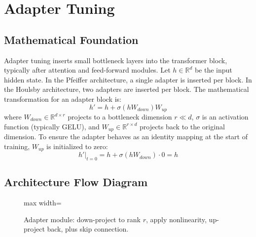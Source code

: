 \documentclass{article}
\begin{document}
\newpage
\section{Adapter Tuning}

\subsection{Mathematical Foundation}
Adapter tuning inserts small bottleneck layers into the transformer block, typically after attention and feed-forward modules. Let $h \in \mathbb{R}^d$ be the input hidden state.
In the Pfeiffer architecture, a single adapter is inserted per block. In the Houlsby architecture, two adapters are inserted per block. The mathematical transformation for an adapter block is:
\begin{equation}
  h' = h + \sigma(h W_{down}) W_{up}
\end{equation}
where $W_{down} \in \mathbb{R}^{d \times r}$ projects to a bottleneck dimension $r \ll d$, $\sigma$ is an activation function (typically GELU), and $W_{up} \in \mathbb{R}^{r \times d}$ projects back to the original dimension.
To ensure the adapter behaves as an identity mapping at the start of training, $W_{up}$ is initialized to zero:
\begin{equation}
  h' \bigr|_{t=0} = h + \sigma(h W_{down}) \cdot 0 = h
\end{equation}

\subsection{Architecture Flow Diagram}

\begin{figure}[h]
\centering
\begin{adjustbox}{max width=\linewidth}
\end{adjustbox}
\caption{Adapter module: down-project to rank $r$, apply nonlinearity, up-project back, plus skip connection.}
\end{figure}
\end{document}
